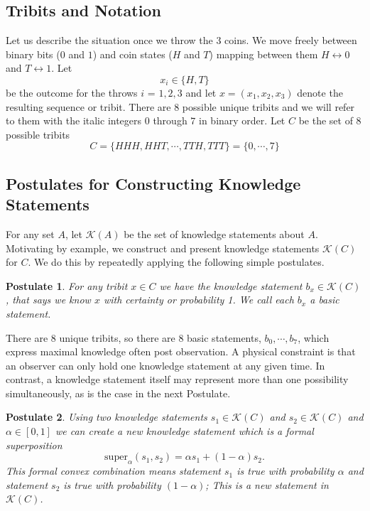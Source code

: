\documentclass[12pt,a4paper]{article}
\theoremstyle{myrule}
\theoremstyle{postulate}
\newtheorem{postulate}{Postulate}[section]
\theoremstyle{definition}
\begin{document}
\subsection{Tribits and Notation}
Let us describe the situation once we throw the 3 coins.  We move freely between binary bits ($0$ and $1$) and coin states ($H$ and $T$) mapping between them $H \leftrightarrow 0$ and $T \leftrightarrow 1$. Let
\[
x_i \in \{H,T\}
\]
be the outcome for the throws $i$ = $1,2,3$ and let $x = (x_1, x_2, x_3)$ denote the resulting sequence or tribit.  There are 8 possible unique tribits and we will refer to them with the italic integers $\mathit{0}$ through $\mathit{7}$ in binary order.  Let $C$ be the set of 8 possible tribits
\[
 C = \{HHH,HHT,\cdots,TTH, TTT\} = \{\mathit{0},\cdots,\mathit{7}\}
\]
  
\subsection{Postulates for Constructing Knowledge Statements}
For any set $A$, let $\mathcal{K}(A)$ be the set of knowledge statements about $A$.  Motivating by example, we construct and present knowledge statements $\mathcal{K}(C)$ for $C$.  We do this by repeatedly applying the following simple postulates.
\begin{postulate}
\label{rule1}
For any tribit $x \in C$ we have the knowledge statement $b_x \in \mathcal{K}(C)$, that says we know $x$ with certainty or probability 1.  We call each $b_x$ a basic statement.
\end{postulate}
There are 8 unique tribits, so there are 8 basic statements, $b_\mathit{0},\cdots,b_\mathit{7}$, which express maximal knowledge often post observation.  A physical constraint is that an observer can only hold one knowledge statement at any given time.  In contrast, a knowledge statement itself may represent more than one possibility simultaneously, as is the case in the next Postulate.
\begin{postulate}
  \label{rule2}
  Using two knowledge statements $s_1 \in \mathcal{K}(C)$ and $s_2 \in \mathcal{K}(C)$ and $\alpha \in [0,1]$ we can create a new knowledge statement which is a formal superposition
  \begin{equation}
  \label{super}
  \text{super}_\alpha(s_1,s_2) = \alpha s_1 + (1 -\alpha) s_2.
  \end{equation}
This formal convex combination means statement $s_1$ is true with probability $\alpha$ and statement $s_2$ is true with probability $(1-\alpha)$; This is a new statement in $ \mathcal{K}(C)$.
\end{postulate}
\end{document}
